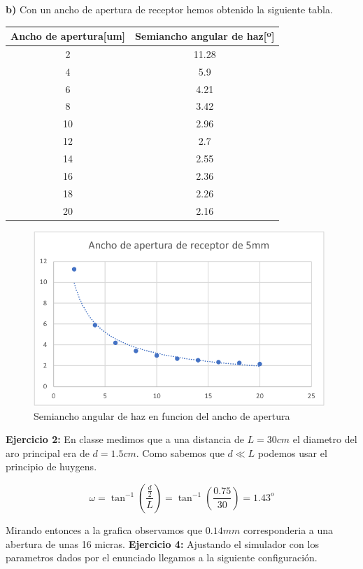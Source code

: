 \documentclass[12pt, a4papre]{article}
\begin{document}
	
	\textbf{b)} Con un ancho de apertura de receptor hemos obtenido la siguiente tabla.
	\begin{center}
		\begin{tabular}{ ||c|c|| } 
			\hline
			Ancho de apertura[um]& Semiancho angular de haz[º]\\ 
			\hline
			2 & 11.28\\ 
			4 & 5.9\\ 
			6 & 4.21\\ 
			8 & 3.42\\ 
			10 & 2.96\\ 
			12 & 2.7\\ 
			14 & 2.55\\ 
			16 & 2.36\\ 
			18 & 2.26\\ 
			20 & 2.16\\ 
			\hline
		\end{tabular}
	\end{center}
	
	\begin{figure}[H]
		\begin{center}
		\includegraphics[width=110mm]{graph1.png}
		\caption{Semiancho angular de haz en funcion del ancho de apertura}
		\end{center}
	\end{figure}
	
	\textbf{Ejercicio 2:} En classe medimos que a una distancia de $L=30cm$ el diametro del aro principal era de $d=1.5cm$. Como sabemos que $d\ll L$ podemos usar el principio de huygens.
	
	\[
	 	\omega = \tan^{-1}\left(\frac{\frac{d}{2}}{L}\right) = \tan^{-1}\left(\frac{0.75}{30}\right) = 1.43^o
	\]
	
	Mirando entonces a la grafica observamos que $0.14mm$ corresponderia a una abertura de unas 16 micras.
	\newpage
	\textbf{Ejercicio 4:} Ajustando el simulador con los parametros dados por el enunciado llegamos a la siguiente configuración.
	
\end{document}
